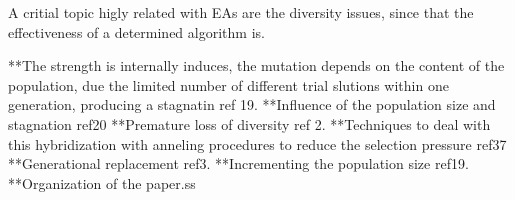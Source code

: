 %
A critial topic higly related with EAs are the diversity issues, since that the effectiveness of a determined algorithm is.

**The strength is internally induces, the mutation depends  on the content of the population, due the limited number of different trial slutions within one generation, producing a stagnatin ref 19.
**Influence of the population size and stagnation ref20
**Premature loss of diversity ref 2.
   **Techniques to deal with this hybridization with anneling procedures to reduce the selection pressure ref37
   **Generational replacement ref3.
   **Incrementing the population size ref19.
**Organization of the paper.ss
